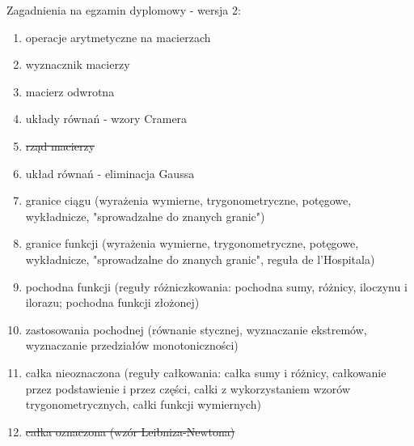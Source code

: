\documentclass[12pt]{article}
\begin{document}
Zagadnienia na egzamin dyplomowy - wersja 2:
\begin{enumerate}
\item operacje arytmetyczne na macierzach
\item wyznacznik macierzy
\item macierz odwrotna
\item układy równań - wzory Cramera
\item \sout{rząd macierzy}
\item układ równań - eliminacja Gaussa
\item granice ciągu (wyrażenia wymierne, trygonometryczne, potęgowe, wykładnicze, "sprowadzalne do znanych granic")
\item granice funkcji (wyrażenia wymierne, trygonometryczne, potęgowe, wykładnicze, "sprowadzalne do znanych granic", reguła de l'Hospitala)
\item pochodna funkcji (reguły różniczkowania: pochodna sumy, różnicy, iloczynu i ilorazu; pochodna funkcji złożonej)
\item zastosowania pochodnej (równanie stycznej, wyznaczanie ekstremów, wyznaczanie przedziałów monotoniczności)
\item całka nieoznaczona (reguły całkowania: całka sumy i różnicy, całkowanie przez podstawienie i przez części, całki z wykorzystaniem wzorów trygonometrycznych, całki funkcji wymiernych)
\item \sout{całka oznaczona (wzór Leibniza-Newtona)}
\end{enumerate}
\end{document}
